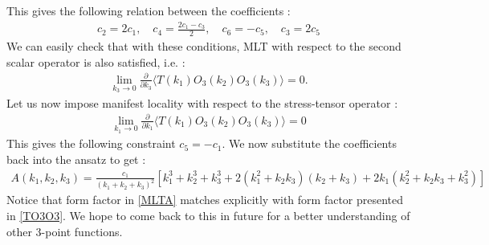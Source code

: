 \documentclass[a4paper,11pt]{article}
\begin{document}
%
This gives the following relation between the coefficients :
%
\begin{align}
c_2=2c_1,\quad c_4=\frac{2c_1-c_3}{2},\quad c_6=-c_5,\quad c_3=2c_5
\end{align}
%
We can easily check that with these conditions, MLT with respect to the second scalar operator is also satisfied, i.e. : 
\begin{align}
\lim_{k_3\rightarrow 0}\frac{\partial}{\partial k_3}\langle T(k_1)O_3(k_2)O_3(k_3)\rangle=0.
\end{align}
Let us now impose manifest locality with respect to the stress-tensor operator :
%
\begin{align}
\lim_{k_1\rightarrow 0}\frac{\partial}{\partial k_1}\langle T(k_1)O_3(k_2)O_3(k_3)\rangle=0
\end{align}
%
This gives the following constraint $c_5=-c_1$.
%
We now substitute the coefficients back into the ansatz to get :
%
\begin{align}\label{MLTA}
A(k_1,k_2,k_3)=\frac{c_1}{(k_1+k_2+k_3)^2}\left[ k_1^3+k_2^3+k_3^3+2(k_1^2+k_2k_3)(k_2+k_3)+2k_1(k_2^2+k_2k_3+k_3^2)\right]
\end{align}
Notice that form factor in \eqref{MLTA} matches explicitly with form factor presented in \eqref{TO3O3}.
%
We hope to come back to this in future for a better understanding of other  3-point functions.
%
%
%
\end{document}
